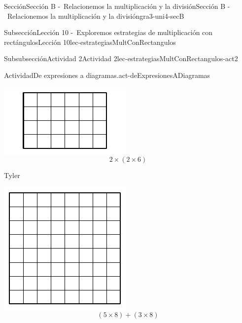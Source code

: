 \begin{sectionptx}{Sección}{Sección B -~Relacionemos la multiplicación y la división}{}{Sección B -~Relacionemos la multiplicación y la división}{}{}{gra3-uni4-secB}
\begin{subsectionptx}{Subsección}{Lección 10 -~Exploremos estrategias de multiplicación con rectángulos}{}{Lección 10}{}{}{lec-estrategiasMultConRectangulos}
\begin{subsubsectionptx}{Subsubsección}{Actividad 2}{}{Actividad 2}{}{}{lec-estrategiasMultConRectangulos-act2}
\begin{activity}{Actividad}{De expresiones a diagramas.}{act-deExpresionesADiagramas}
\begin{sidebyside}{3}{0.0166666666666667}{0.0166666666666667}{0.0333333333333333}
\begin{sbspanel}{0.3}
\includegraphics[max width=\linewidth, center]{external/svg-source/tikz-file-153053.pdf}
%
\begin{equation*}
2 \times (2 \times 6)
\end{equation*}
%
\end{sbspanel}%
\begin{sbspanel}{0.3}%
Tyler%
\par
\includegraphics[max width=\linewidth, center]{external/svg-source/tikz-file-153054.pdf}
%
\begin{equation*}
(5 \times 8) + (3 \times 8)
\end{equation*}
%
\end{sbspanel}%

\end{sidebyside}
\end{activity}
\end{subsubsectionptx}
\end{subsectionptx}
\end{sectionptx}
